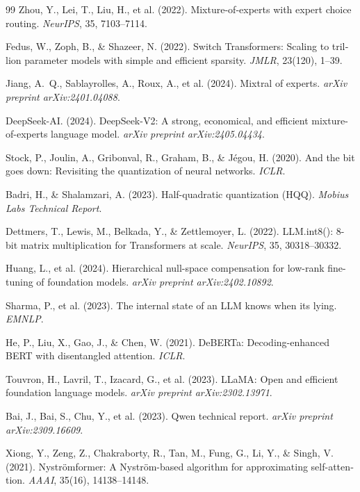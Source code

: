 \documentclass[12pt,a4paper]{report}
\theoremstyle{definition}
\begin{document}
\begin{latin}
\begin{thebibliography}{99}
Zhou, Y., Lei, T., Liu, H., et al. (2022).
Mixture-of-experts with expert choice routing.
\textit{NeurIPS}, 35, 7103--7114.

Fedus, W., Zoph, B., \& Shazeer, N. (2022).
Switch Transformers: Scaling to trillion parameter models with simple and efficient sparsity.
\textit{JMLR}, 23(120), 1--39.

Jiang, A.~Q., Sablayrolles, A., Roux, A., et al. (2024).
Mixtral of experts.
\textit{arXiv preprint arXiv:2401.04088}.

DeepSeek-AI. (2024).
DeepSeek-V2: A strong, economical, and efficient mixture-of-experts language model.
\textit{arXiv preprint arXiv:2405.04434}.

Stock, P., Joulin, A., Gribonval, R., Graham, B., \& J{\'e}gou, H. (2020).
And the bit goes down: Revisiting the quantization of neural networks.
\textit{ICLR}.

Badri, H., \& Shalamzari, A. (2023).
Half-quadratic quantization (HQQ).
\textit{Mobius Labs Technical Report}.

Dettmers, T., Lewis, M., Belkada, Y., \& Zettlemoyer, L. (2022).
LLM.int8(): 8-bit matrix multiplication for Transformers at scale.
\textit{NeurIPS}, 35, 30318--30332.

Huang, L., et al. (2024).
Hierarchical null-space compensation for low-rank fine-tuning of foundation models.
\textit{arXiv preprint arXiv:2402.10892}.

Sharma, P., et al. (2023).
The internal state of an LLM knows when its lying.
\textit{EMNLP}.

He, P., Liu, X., Gao, J., \& Chen, W. (2021).
DeBERTa: Decoding-enhanced BERT with disentangled attention.
\textit{ICLR}.

Touvron, H., Lavril, T., Izacard, G., et al. (2023).
LLaMA: Open and efficient foundation language models.
\textit{arXiv preprint arXiv:2302.13971}.

Bai, J., Bai, S., Chu, Y., et al. (2023).
Qwen technical report.
\textit{arXiv preprint arXiv:2309.16609}.

Xiong, Y., Zeng, Z., Chakraborty, R., Tan, M., Fung, G., Li, Y., \& Singh, V. (2021).
Nystr{\"o}mformer: A Nystr{\"o}m-based algorithm for approximating self-attention.
\textit{AAAI}, 35(16), 14138--14148.


\end{thebibliography}
\end{latin}
\end{document}
